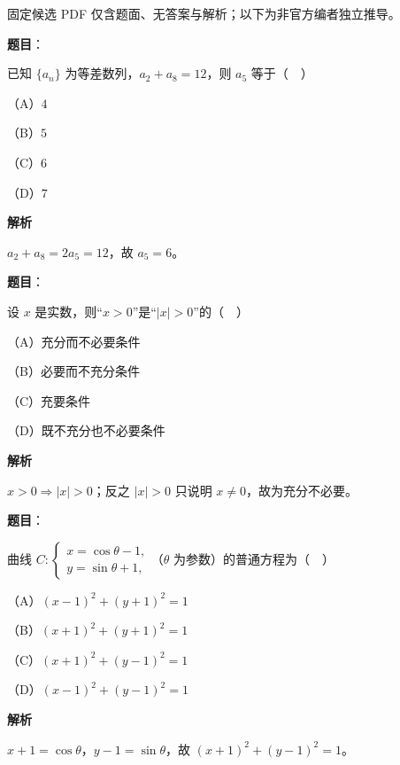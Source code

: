 

\begin{gktip}
固定候选 PDF 仅含题面、无答案与解析；以下为非官方编者独立推导。
\end{gktip}

\begin{answer}

\textbf{题目}：

已知 $\{a_n\}$ 为等差数列，$a_2+a_8=12$，则 $a_5$ 等于（　）

（A）$4$

（B）$5$

（C）$6$

（D）$7$

\textbf{解析}

$a_2+a_8=2a_5=12$，故 $a_5=6$。


\end{answer}
\begin{answer}

\textbf{题目}：

设 $x$ 是实数，则“$x>0$”是“$|x|>0$”的（　）

（A）充分而不必要条件

（B）必要而不充分条件

（C）充要条件

（D）既不充分也不必要条件

\textbf{解析}

$x>0\Rightarrow|x|>0$；反之 $|x|>0$ 只说明 $x\neq0$，故为充分不必要。


\end{answer}
\begin{answer}

\textbf{题目}：

曲线 $C:\begin{cases}x=\cos\theta-1,\\ y=\sin\theta+1,\end{cases}$（$\theta$ 为参数）的普通方程为（　）

（A）$(x-1)^2+(y+1)^2=1$

（B）$(x+1)^2+(y+1)^2=1$

（C）$(x+1)^2+(y-1)^2=1$

（D）$(x-1)^2+(y-1)^2=1$

\textbf{解析}

$x+1=\cos\theta$，$y-1=\sin\theta$，故 $(x+1)^2+(y-1)^2=1$。


\end{answer}
